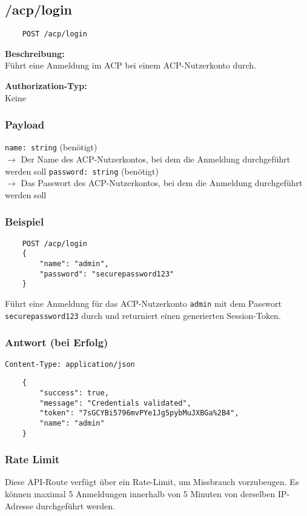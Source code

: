 \subsection{/acp/login}
\label{acpauth}

\begin{lstlisting}
    POST /acp/login
\end{lstlisting}

\textbf{Beschreibung:} \\
Führt eine Anmeldung im ACP bei einem ACP-Nutzerkonto durch.

\textbf{Authorization-Typ:} \\
Keine

\subsubsection{Payload}

\lstinline{name: string} (benötigt) \\
$\rightarrow$ Der Name des ACP-Nutzerkontos, bei dem die Anmeldung durchgeführt werden soll
\lstinline{password: string} (benötigt) \\
$\rightarrow$ Das Passwort des ACP-Nutzerkontos, bei dem die Anmeldung durchgeführt werden soll

\subsubsection{Beispiel}

\begin{lstlisting}
    POST /acp/login
    {
        "name": "admin",
        "password": "securepassword123"
    }
\end{lstlisting}

Führt eine Anmeldung für das ACP-Nutzerkonto \lstinline{admin} mit dem Passwort \lstinline{securepassword123} durch und returniert einen generierten Session-Token.

\subsubsection{Antwort (bei Erfolg)}

\lstinline{Content-Type: application/json}
\begin{lstlisting}
    {
        "success": true, 
        "message": "Credentials validated",
        "token": "7sGCYBi5796mvPYe1Jg5pybMuJXBGa%2B4",
        "name": "admin"
    }
\end{lstlisting}

\subsubsection{Rate Limit}

Diese API-Route verfügt über ein Rate-Limit, um Missbrauch vorzubeugen. Es können maximal 5 Anmeldungen innerhalb von 5 Minuten von derselben IP-Adresse durchgeführt werden.